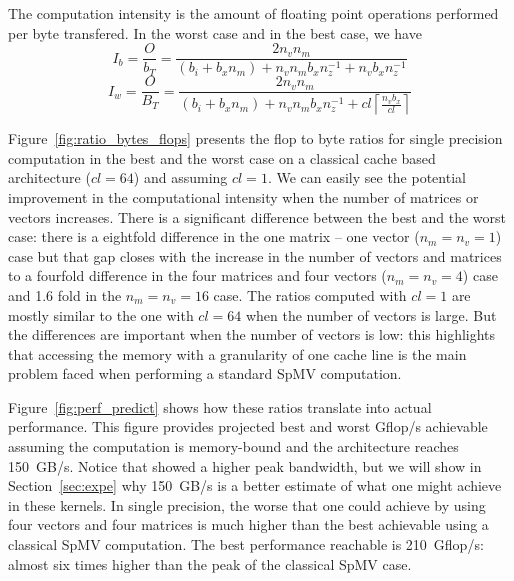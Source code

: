 \documentclass[10pt,conference,compsocconf]{IEEEtran}
\newcommand{\ceil}[1]{\left\lceil#1\right\rceil}
\begin{document}
The computation intensity is the amount of floating point operations performed per
byte transfered. In the worst case and in the best case, we have
$$I_b = \frac{O}{b_T} = \frac{2 n_v n_m}{ (b_i + b_x n_m) + n_v n_m b_x n_z^{-1} + n_v b_x n_z^{-1} }$$
$$I_w = \frac{O}{B_T} = \frac{2 n_v n_m}{(b_i+b_x n_m) + n_v n_m b_x n_z^{-1} + cl \ceil{\frac{n_vb_x}{cl}} }$$


Figure~\ref{fig:ratio_bytes_flops} presents the flop to byte ratios
for single precision computation in the best and the worst case on a
classical cache based architecture ($cl = 64$) and assuming $cl=1$. We
can easily see the potential improvement in the computational
intensity when the number of matrices or vectors increases. There is a
significant difference between the best and the worst case: there is a
eightfold difference in the one matrix -- one vector ($n_m=n_v=1$) case but that gap closes
with the increase in the number of vectors and matrices to a fourfold
difference in the four matrices and four vectors ($n_m=n_v=4$) case and 1.6 fold in the 
$n_m=n_v=16$ case. 
The ratios computed with $cl = 1$ are mostly
similar to the one with $cl=64$ when the number of vectors is
large. But the differences are important when the number of vectors is
low: this highlights that accessing the memory with a granularity of one cache
line
is the main problem faced when performing a standard SpMV computation.

Figure~\ref{fig:perf_predict} shows how these ratios translate
into actual performance. This figure provides projected best and worst
Gflop/s achievable assuming the computation is memory-bound and the
architecture reaches 150~GB/s. Notice that \cite{Saule13-ARXIV}
showed a higher peak bandwidth, but we will show in
Section~\ref{sec:expe} why 150~GB/s is a better estimate of what one
might achieve in these kernels. In single precision, the worse that
one could achieve by using four vectors and four matrices is much higher
than the best achievable using a classical SpMV computation. The best
performance reachable is 210~Gflop/s: almost six times higher than the
peak of the classical SpMV case. 
\end{document}
